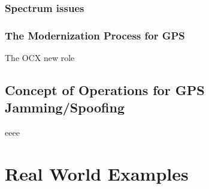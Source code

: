 \documentclass[PhD,binding=0.6cm]{dithesis}
\begin{document}
\subsection{Spectrum issues}
\subsection{The Modernization Process for GPS}

The OCX new role

\section{Concept of Operations for GPS Jamming/Spoofing}

eeee \cite{GPSCapkun2011,Johnson2003}


\chapter{Real World Examples}
\end{document}
